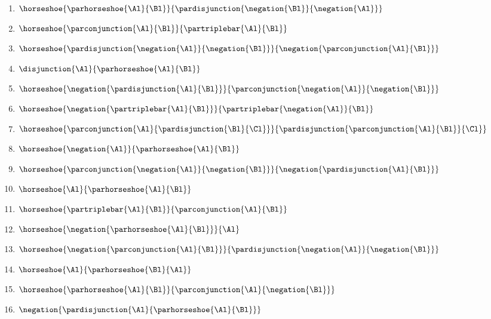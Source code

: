 \begin{enumerate}
\item {$\horseshoe{\parhorseshoe{\Al}{\Bl}}{\pardisjunction{\negation{\Bl}}{\negation{\Al}}}$}
\item {$\horseshoe{\parconjunction{\Al}{\Bl}}{\partriplebar{\Al}{\Bl}}$}
\item {$\horseshoe{\pardisjunction{\negation{\Al}}{\negation{\Bl}}}{\negation{\parconjunction{\Al}{\Bl}}}$}
\item {$\disjunction{\Al}{\parhorseshoe{\Al}{\Bl}}$}
\item {$\horseshoe{\negation{\pardisjunction{\Al}{\Bl}}}{\parconjunction{\negation{\Al}}{\negation{\Bl}}}$}
\item {$\horseshoe{\negation{\partriplebar{\Al}{\Bl}}}{\partriplebar{\negation{\Al}}{\Bl}}$}
\item {$\horseshoe{\parconjunction{\Al}{\pardisjunction{\Bl}{\Cl}}}{\pardisjunction{\parconjunction{\Al}{\Bl}}{\Cl}}$}
\item {$\horseshoe{\negation{\Al}}{\parhorseshoe{\Al}{\Bl}}$}
\item {$\horseshoe{\parconjunction{\negation{\Al}}{\negation{\Bl}}}{\negation{\pardisjunction{\Al}{\Bl}}}$}
\item {$\horseshoe{\Al}{\parhorseshoe{\Al}{\Bl}}$}
\item {$\horseshoe{\partriplebar{\Al}{\Bl}}{\parconjunction{\Al}{\Bl}}$}
\item {$\horseshoe{\negation{\parhorseshoe{\Al}{\Bl}}}{\Al}$}
\item {$\horseshoe{\negation{\parconjunction{\Al}{\Bl}}}{\pardisjunction{\negation{\Al}}{\negation{\Bl}}}$}
\item {$\horseshoe{\Al}{\parhorseshoe{\Bl}{\Al}}$}
\item {$\horseshoe{\parhorseshoe{\Al}{\Bl}}{\parconjunction{\Al}{\negation{\Bl}}}$}
\item {$\negation{\pardisjunction{\Al}{\parhorseshoe{\Al}{\Bl}}}$}
\end{enumerate}


